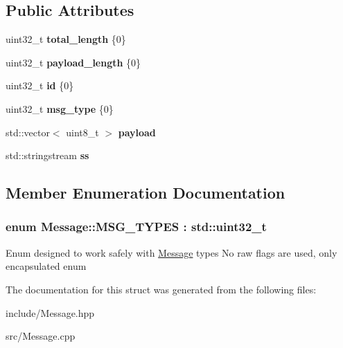 \subsection*{Public Attributes}
\begin{DoxyCompactItemize}
\item 
uint32\+\_\+t {\bfseries total\+\_\+length} \{0\}\hypertarget{structMessage_a956485001345f455ac9ff675c9ec33ff}{}\label{structMessage_a956485001345f455ac9ff675c9ec33ff}

\item 
uint32\+\_\+t {\bfseries payload\+\_\+length} \{0\}\hypertarget{structMessage_a7540c3196a9649f76747a2e559ec34ac}{}\label{structMessage_a7540c3196a9649f76747a2e559ec34ac}

\item 
uint32\+\_\+t {\bfseries id} \{0\}\hypertarget{structMessage_a4c34674ebe8e9ac6a62a5b7c9c3e4123}{}\label{structMessage_a4c34674ebe8e9ac6a62a5b7c9c3e4123}

\item 
uint32\+\_\+t {\bfseries msg\+\_\+type} \{0\}\hypertarget{structMessage_a127a7296f3fe3ca2379b52d4d578d128}{}\label{structMessage_a127a7296f3fe3ca2379b52d4d578d128}

\item 
std\+::vector$<$ uint8\+\_\+t $>$ {\bfseries payload}\hypertarget{structMessage_ae178876b7de2f7d7629663350d20c599}{}\label{structMessage_ae178876b7de2f7d7629663350d20c599}

\item 
std\+::stringstream {\bfseries ss}\hypertarget{structMessage_ac499b4fb6c41a7512584c3cff3c68469}{}\label{structMessage_ac499b4fb6c41a7512584c3cff3c68469}

\end{DoxyCompactItemize}


\subsection{Member Enumeration Documentation}
\subsubsection[{\texorpdfstring{M\+S\+G\+\_\+\+T\+Y\+P\+ES}{MSG_TYPES}}]{\setlength{\rightskip}{0pt plus 5cm}enum {\bf Message\+::\+M\+S\+G\+\_\+\+T\+Y\+P\+ES} \+: std\+::uint32\+\_\+t\hspace{0.3cm}{\ttfamily [strong]}}\hypertarget{structMessage_a2cd191f475dd51cf44f57950e8862cd3}{}\label{structMessage_a2cd191f475dd51cf44f57950e8862cd3}
Enum designed to work safely with \hyperlink{structMessage}{Message} types No raw flags are used, only encapsulated enum 

The documentation for this struct was generated from the following files\+:\begin{DoxyCompactItemize}
\item 
include/Message.\+hpp\item 
src/Message.\+cpp\end{DoxyCompactItemize}
